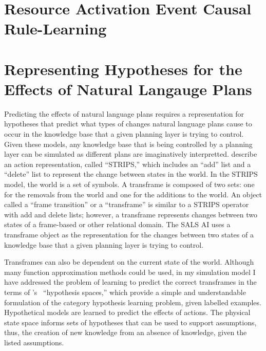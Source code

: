 \section{Resource Activation Event Causal Rule-Learning}


\newpage
\section{Representing Hypotheses for the Effects of Natural Langauge Plans}

Predicting the effects of natural language plans requires a
representation for hypotheses that predict what types of changes
natural language plans cause to occur in the knowledge base that a
given planning layer is trying to control.  Given these models, any
knowledge base that is being controlled by a planning layer can be
simulated as different plans are imaginatively interpretted.
\cite{fikes:1972} describe an action representation, called
``STRIPS,'' which includes an ``add'' list and a ``delete'' list to
represent the change between states in the world.  In the STRIPS
model, the world is a set of symbols.  A transframe is composed of two
sets: one for the removals from the world and one for the additions to
the world.  An object called a ``frame transition''
\cite[]{minsky:1975} or a ``transframe'' \cite[]{minsky:1988} is
similar to a STRIPS operator with add and delete lists; however, a
transframe represents changes between two states of a frame-based or
other relational domain.  The SALS AI uses a transframe object as the
representation for the changes between two states of a knowledge base
that a given planning layer is trying to control.

Transframes can also be dependent on the current state of the world.
Although many function approximation methods could be used, in my
simulation model I have addressed the problem of learning to predict
the correct transframes in the terms of
{\mbox{\citeauthor{mitchell:1997}'s~\citeyearpar{mitchell:1997}}}
``hypothesis spaces,'' which provide a simple and understandable
formulation of the category hypothesis learning problem, given
labelled examples.  Hypothetical models are learned to predict the
effects of actions.  The physical state space informs sets of
hypotheses that can be used to support assumptions, thus, the creation
of new knowledge from an absence of knowledge, given the listed
assumptions.





\newpage
